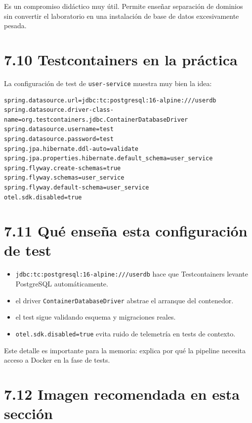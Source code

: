 \documentclass[
a4paper,
12pt]{report}
\providecommand{\tightlist}{%
  \setlength{\itemsep}{0pt}\setlength{\parskip}{0pt}}
\begin{document}
Es un compromiso didáctico muy útil. Permite enseñar separación de
dominios sin convertir el laboratorio en una instalación de base de
datos excesivamente pesada.

\section{7.10 Testcontainers en la
práctica}\label{testcontainers-en-la-pruxe1ctica}

La configuración de test de \texttt{user-service} muestra muy bien la
idea:

\begin{verbatim}
spring.datasource.url=jdbc:tc:postgresql:16-alpine:///userdb
spring.datasource.driver-class-name=org.testcontainers.jdbc.ContainerDatabaseDriver
spring.datasource.username=test
spring.datasource.password=test
spring.jpa.hibernate.ddl-auto=validate
spring.jpa.properties.hibernate.default_schema=user_service
spring.flyway.create-schemas=true
spring.flyway.schemas=user_service
spring.flyway.default-schema=user_service
otel.sdk.disabled=true
\end{verbatim}

\section{7.11 Qué enseña esta configuración de
test}\label{quuxe9-enseuxf1a-esta-configuraciuxf3n-de-test}

\begin{itemize}
\tightlist
\item
  \texttt{jdbc:tc:postgresql:16-alpine:///userdb} hace que
  Testcontainers levante PostgreSQL automáticamente.
\item
  el driver \texttt{ContainerDatabaseDriver} abstrae el arranque del
  contenedor.
\item
  el test sigue validando esquema y migraciones reales.
\item
  \texttt{otel.sdk.disabled=true} evita ruido de telemetría en tests de
  contexto.
\end{itemize}

Este detalle es importante para la memoria: explica por qué la pipeline
necesita acceso a Docker en la fase de tests.

\section{7.12 Imagen recomendada en esta
sección}\label{imagen-recomendada-en-esta-secciuxf3n-1}
\end{document}
